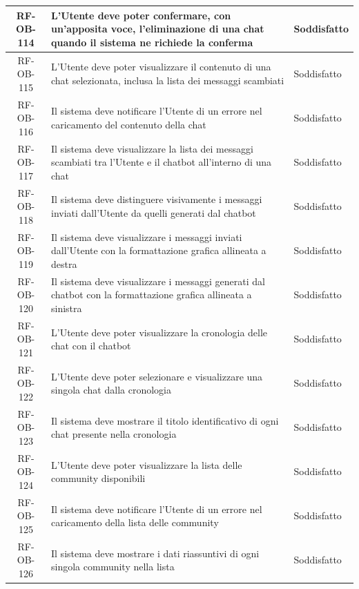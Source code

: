 \documentclass[a4paper,12pt]{article}
\begin{document}
\begin{center}
\begin{longtable}{|c|p{8.5cm}|>{\centering\arraybackslash}p{4cm}|}
RF-OB-114 & L'Utente deve poter confermare, con un'apposita voce, l'eliminazione di una chat quando il sistema ne richiede la conferma & Soddisfatto \\
\hline

RF-OB-115 & L'Utente deve poter visualizzare il contenuto di una chat selezionata, inclusa la lista dei messaggi scambiati & Soddisfatto \\
\hline

RF-OB-116 & Il sistema deve notificare l'Utente di un errore nel caricamento del contenuto della chat & Soddisfatto \\
\hline

RF-OB-117 & Il sistema deve visualizzare la lista dei messaggi scambiati tra l'Utente e il chatbot all'interno di una chat & Soddisfatto \\
\hline

RF-OB-118 & Il sistema deve distinguere visivamente i messaggi inviati dall'Utente da quelli generati dal chatbot & Soddisfatto \\
\hline

RF-OB-119 & Il sistema deve visualizzare i messaggi inviati dall'Utente con la formattazione grafica allineata a destra & Soddisfatto \\
\hline

RF-OB-120 & Il sistema deve visualizzare i messaggi generati dal chatbot con la formattazione grafica allineata a sinistra & Soddisfatto \\
\hline

RF-OB-121 & L'Utente deve poter visualizzare la cronologia delle chat con il chatbot & Soddisfatto \\
\hline

RF-OB-122 & L'Utente deve poter selezionare e visualizzare una singola chat dalla cronologia & Soddisfatto \\
\hline

RF-OB-123 & Il sistema deve mostrare il titolo identificativo di ogni chat presente nella cronologia & Soddisfatto \\
\hline

RF-OB-124 & L'Utente deve poter visualizzare la lista delle community disponibili & Soddisfatto \\
\hline

RF-OB-125 & Il sistema deve notificare l'Utente di un errore nel caricamento della lista delle community & Soddisfatto \\
\hline

RF-OB-126 & Il sistema deve mostrare i dati riassuntivi di ogni singola community nella lista & Soddisfatto \\
\hline


\end{longtable}
\end{center}
\end{document}
